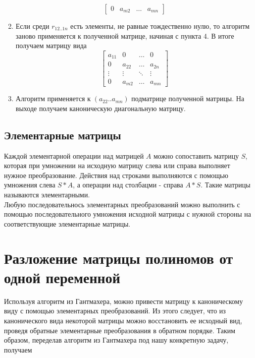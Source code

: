 \documentclass[14pt, a4paper]{extreport}
\begin{document}
\begin{enumerate}
\[\begin{bmatrix}
					0 & a_{m2} & \dots & a_{mn}
				\end{bmatrix}
			\]
		\item Если среди $r_{12..1n}$ есть элементы, не равные тождественно
			нулю, то алгоритм заново применяется к полученной матрице, начиная
			с пункта 4. В итоге получаем матрицу вида
			\[
				\begin{bmatrix}
					a_{11} & 0 & \dots & 0 \\
					0 & a_{22} & \dots & a_{2n} \\
					\vdots & \vdots & \ddots & \vdots \\
					0 & a_{m2} & \dots & a_{mn}
				\end{bmatrix}
			\]
		\item Алгоритм применяется к $(a_{22}..a_{mn})$ подматрице полученной матрицы.
			На выходе получаем каноническую диагональную матрицу.
	\end{enumerate}
	\newpage
	\section{Элементарные матрицы}
		Каждой элементарной операции над матрицей $A$ можно сопоставить матрицу $S$,
		которая при умножении на исходную матрицу слева или справа выполняет нужное
		преобразование. Действия над строками выполняются с помощью умножения слева
		$S*A$, а операции над столбацми - справа $A*S$. Такие матрицы называются
		элементарными. \\ Любую последовательнось элементарных преобразований можно
		выполнить с помощью последовательного умножения исходной матрицы с нужной
		стороны на соответствующие элементарные матрицы.
\chapter{Разложение матрицы полиномов от одной переменной}
	Используя алгоритм из Гантмахера, можно привести матрицу к каноническому виду с
	помощью элементарных преобразований. Из этого следует, что из канонического
	вида некоторой матрицы можно восстановить ее исходный вид, проведя обратные
	элементарные преобразования в обратном порядке. Таким образом, переделав
	алгоритм из Гантмахера под нашу конкретную задачу, получаем
\end{document}
